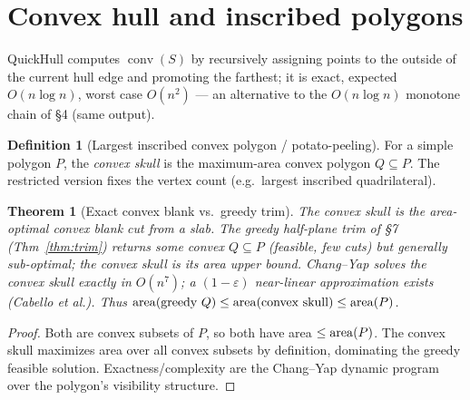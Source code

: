 \documentclass[11pt]{article}
\theoremstyle{definition}\newtheorem{definition}{Definition}[section]
\theoremstyle{plain}\newtheorem{theorem}{Theorem}[section]
\DeclareMathOperator{\conv}{conv}\DeclareMathOperator*{\argmin}{arg\,min}
\begin{document}
\section{Convex hull and inscribed polygons}
\begin{proposition}[QuickHull]
QuickHull computes $\conv(S)$ by recursively assigning points to the outside of the current hull edge and
promoting the farthest; it is exact, expected $O(n\log n)$, worst case $O(n^2)$ --- an alternative to the
$O(n\log n)$ monotone chain of \S4 (same output).
\end{proposition}
\begin{definition}[Largest inscribed convex polygon / potato-peeling]
For a simple polygon $P$, the \emph{convex skull} is the maximum-area convex polygon $Q\subseteq P$. The
restricted version fixes the vertex count (e.g.\ largest inscribed quadrilateral).
\end{definition}
\begin{theorem}[Exact convex blank vs.\ greedy trim]\label{thm:potato}
The convex skull is the area-optimal convex blank cut from a slab. The greedy half-plane trim of \S7
(Thm~\ref{thm:trim}) returns \emph{some} convex $Q\subseteq P$ (feasible, few cuts) but generally
sub-optimal; the convex skull is its area upper bound. Chang--Yap solves the convex skull exactly in $O(n^7)$;
a $(1-\varepsilon)$ near-linear approximation exists (Cabello et al.). Thus
$\operatorname{area}(\text{greedy }Q)\le\operatorname{area}(\text{convex skull})\le\operatorname{area}(P)$.
\end{theorem}
\begin{proof}
Both are convex subsets of $P$, so both have area $\le\operatorname{area}(P)$. The convex skull maximizes area over all
convex subsets by definition, dominating the greedy feasible solution. Exactness/complexity are the
Chang--Yap dynamic program over the polygon's visibility structure.
\end{proof}
\end{document}
